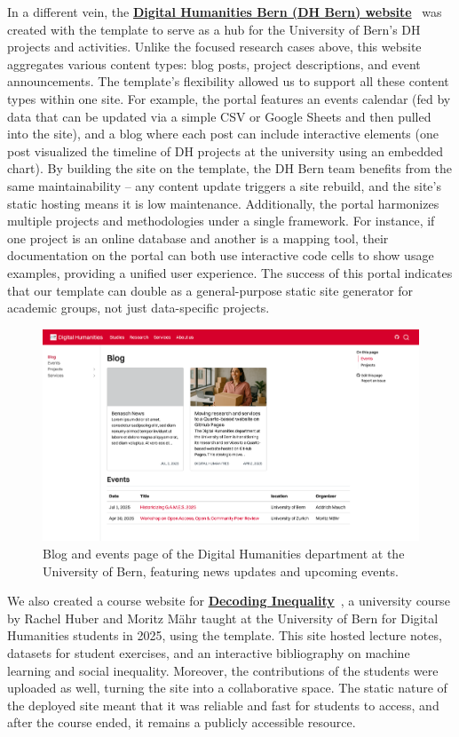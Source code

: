 \documentclass[final]{anthology-ch} %
\begin{document}
In a different vein, the \href{https://dhbern.github.io/}{\textbf{Digital Humanities Bern (DH Bern) website}}~\cite{digitalhumanitiesbern2025} was created with the template to serve as a hub for the University of Bern's DH projects and activities. Unlike the focused research cases above, this website aggregates various content types: blog posts, project descriptions, and event announcements. The template's flexibility allowed us to support all these content types within one site. For example, the portal features an events calendar (fed by data that can be updated via a simple CSV or Google Sheets and then pulled into the site), and a blog where each post can include interactive elements (one post visualized the timeline of DH projects at the university using an embedded chart). By building the site on the template, the DH Bern team benefits from the same maintainability -- any content update triggers a site rebuild, and the site's static hosting means it is low maintenance. Additionally, the portal harmonizes multiple projects and methodologies under a single framework. For instance, if one project is an online database and another is a mapping tool, their documentation on the portal can both use interactive code cells to show usage examples, providing a unified user experience. The success of this portal indicates that our template can double as a general-purpose static site generator for academic groups, not just data-specific projects.

\begin{figure}[t!]
  \centering
  \includegraphics[width=0.9\linewidth]{images/dhbern.png}
  \caption{Blog and events page of the Digital Humanities department at the University of Bern, featuring news updates and upcoming events.}
  \label{fig-dh-bern}
\end{figure}

We also created a course website for \href{https://dhbern.github.io/decoding-inequality-2025/}{\textbf{Decoding Inequality}}~\cite{huber2024}, a university course by Rachel Huber and Moritz Mähr taught at the University of Bern for Digital Humanities students in 2025, using the template. This site hosted lecture notes, datasets for student exercises, and an interactive bibliography on machine learning and social inequality. Moreover, the contributions of the students were uploaded as well, turning the site into a collaborative space. The static nature of the deployed site meant that it was reliable and fast for students to access, and after the course ended, it remains a publicly accessible resource.
\end{document}
